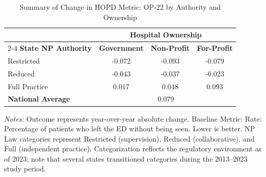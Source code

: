 \begin{table}[htbp]
    \centering
    \caption{Summary of Change in HOPD Metric: OP-22 by Authority and Ownership}
    \label{tab:d_hopd_op_22}
    \vspace{0.2cm}
    \begin{tabular}{lccc}
        \toprule
        & \multicolumn{3}{c}{\textbf{Hospital Ownership}} \\
        \cmidrule(lr){2-4}
        \textbf{State NP Authority} & \textbf{Government} & \textbf{Non-Profit} & \textbf{For-Profit} \\
        \midrule
        Restricted & -0.072 & -0.093 & -0.079 \\
        Reduced & -0.043 & -0.037 & -0.023 \\
        Full Practice & 0.017 & 0.048 & 0.093 \\
        \midrule
        \textbf{National Average} & \multicolumn{3}{c}{0.079} \\
        \bottomrule
    \end{tabular}
    \vspace{0.1cm}
    \begin{minipage}{0.85\textwidth}
        \footnotesize \textit{Notes:} Outcome represents year-over-year absolute change. Baseline Metric: Rate: Percentage of patients who left the ED without being seen. Lower is better. NP Law categories represent Restricted (supervision), Reduced (collaborative), and Full (independent practice). Categorization reflects the regulatory environment as of 2023; note that several states transitioned categories during the 2013--2023 study period.
    \end{minipage}
\end{table}